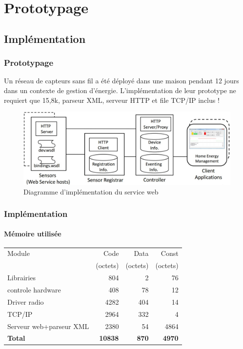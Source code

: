 \section{Prototypage}
\subsection{Implémentation}
\begin{frame}
 \frametitle{Prototypage}
 Un réseau de capteurs sans fil a été déployé dans une maison pendant 12 jours dans un contexte de gestion d'énergie.
 L'implémentation de leur prototype ne requiert que 15,8k, parseur XML, serveur HTTP et file TCP/IP inclus !
 \begin{figure}
  \centering
  \includegraphics[scale=0.36]{figures/implementation.jpg}
  \caption{Diagramme d'implémentation du service web}
 \end{figure} 
\end{frame}

\newcommand{\unite}{(octets)}
\begin{frame}%
 \frametitle{Implémentation}
 \framesubtitle{Mémoire utilisée}
 \begin{center}
 \begin{tabular}{|l|r|r|r|}
  \hline
  Module & Code & Data & Const\\
  ~ & \unite & \unite & \unite \\
  \hline
  Librairies & 804 & 2 & 76\\
  controle hardware & 408 & 78 & 12\\
  Driver radio & 4282 & 404 & 14\\
  TCP/IP & 2964 & 332 & 4\\
  Serveur web+parseur XML & 2380 & 54 & 4864\\
  \hline
  \textbf{Total} & \textbf{10838} & \textbf{870} & \textbf{4970}\\
  \hline
 \end{tabular}
 \end{center}
\end{frame}

